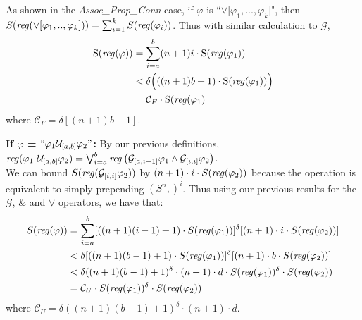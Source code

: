 \documentclass[runningheads]{llncs}
\renewcommand{\phi}{\varphi}
\begin{document}
 As shown in the \textit{Assoc\_Prop\_Conn} case, if $\phi$ is ``$\lor[\phi_1, ... ,\phi_k$]", then \\
 $S(\text{\emph{reg}}(\lor [\phi_{1}, .., \phi_{k}])) = 
    \sum_{i=1}^{k} S(\text{\emph{reg}}(\phi_{i}))$. Thus with similar calculation to $\mathcal{G}$,
 \begin{align*}
     \text{S(\emph{reg}}(\phi)) &= \sum_{i=a}^{b} (n+1)i \cdot \text{S(\emph{reg}}(\phi_{1})) \\
     &< \delta\Bigl(((n+1)b+1) \cdot \text{S(\emph{reg}}(\phi_1))\Bigl) \\
     &= \mathcal{C}_{F} \cdot \text{S(\emph{reg}}(\phi_1)
 \end{align*}
 where $\mathcal{C}_{F} = \delta[(n+1)b+1]$.
 
 \textbf{If $\phi$ = $``\phi_1 \mathcal{U}_{[a, b]} \phi_2"$:}
    By our previous definitions, 
    $\text{\emph{reg}}(\phi_1 \ \mathcal{U}_{[a,b]} \phi_2) =  \bigvee_{i=a}^{b} \text{\emph{reg}}\left(\mathcal{G}_{[a,i-1]}\phi_1 \land \mathcal{G}_{[i, i]} \phi_2\right)$. \\
    We can bound $S(\text{\emph{reg}}(\mathcal{G}_{[i, i]} \phi_2))$ by $(n+1) \cdot i \cdot S(\text{\emph{reg}}(\phi_2))$ because the operation is equivalent to simply prepending $(S^n ,)^i$.
    Thus using our previous results for the $\mathcal{G}$, $\&$ and $\lor$ operators, we have that:
    \begin{align*}
        S(\text{\emph{reg}}(\phi)) &= 
        \sum_{i = a}^b [((n+1)(i-1) + 1) \cdot S(\text{\emph{reg}}(\phi_1))]^\delta 
        [(n+1) \cdot i \cdot S(\text{\emph{reg}}(\phi_2))] \\
        &< \delta [((n+1)(b-1) + 1) \cdot S(\text{\emph{reg}}(\phi_1))]^\delta 
        [(n+1) \cdot b \cdot S(\text{\emph{reg}}(\phi_2))] \\
        &< \delta ((n+1)(b-1) + 1)^\delta \cdot (n+1) \cdot d \cdot S(\text{\emph{reg}}(\phi_1))^\delta \cdot S(\text{\emph{reg}}(\phi_2)) \\
        &= \mathcal{C}_U \cdot S(\text{\emph{reg}}(\phi_1))^\delta \cdot S(\text{\emph{reg}}(\phi_2))
    \end{align*}
    where $\mathcal{C}_U = \delta ((n+1)(b-1) + 1)^\delta \cdot (n+1) \cdot d$.
 
\end{document}
